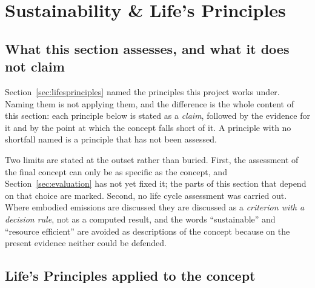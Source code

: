 \section{Sustainability \& Life's Principles}
\label{sec:sustainability}

\subsection{What this section assesses, and what it does not claim}

Section~\ref{sec:lifesprinciples} named the principles this project works under.
Naming them is not applying them, and the difference is the whole content of
this section: each principle below is stated as a \emph{claim}, followed by the
evidence for it and by the point at which the concept falls short of it. A
principle with no shortfall named is a principle that has not been assessed.

Two limits are stated at the outset rather than buried. First, the assessment
of the final concept can only be as specific as the concept, and
Section~\ref{sec:evaluation} has not yet fixed it; the parts of this section
that depend on that choice are marked. Second, no life cycle assessment was
carried out. Where embodied emissions are discussed they are discussed as a
\emph{criterion with a decision rule}, not as a computed result, and the words
\enquote{sustainable} and \enquote{resource efficient} are avoided as
descriptions of the concept because on the present evidence neither could be
defended.

\subsection{Life's Principles applied to the concept}

